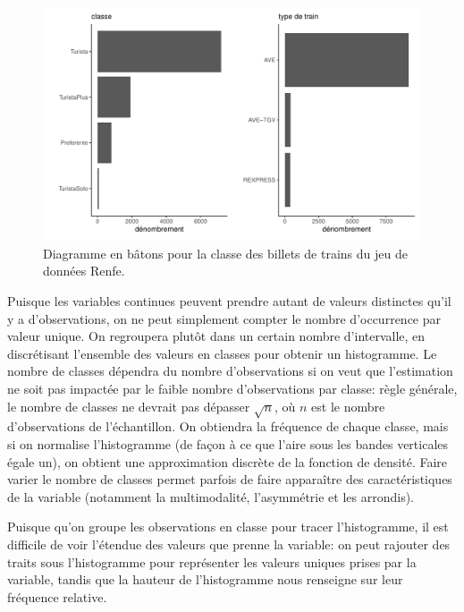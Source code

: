 \documentclass[
  11pt,
  letterpaper,
]{scrbook}
\theoremstyle{definition}
\theoremstyle{remark}
\begin{document}
\begin{figure}[ht!]

{\centering \includegraphics[width=1\textwidth,height=\textheight]{analyseexploratoire_files/figure-pdf/fig-barplotrenfe-1.pdf}

}

\caption{\label{fig-barplotrenfe}Diagramme en bâtons pour la classe des
billets de trains du jeu de données Renfe.}

\end{figure}

Puisque les variables continues peuvent prendre autant de valeurs
distinctes qu'il y a d'observations, on ne peut simplement compter le
nombre d'occurrence par valeur unique. On regroupera plutôt dans un
certain nombre d'intervalle, en discrétisant l'ensemble des valeurs en
classes pour obtenir un histogramme. Le nombre de classes dépendra du
nombre d'observations si on veut que l'estimation ne soit pas impactée
par le faible nombre d'observations par classe: règle générale, le
nombre de classes ne devrait pas dépasser \(\sqrt{n}\), où \(n\) est le
nombre d'observations de l'échantillon. On obtiendra la fréquence de
chaque classe, mais si on normalise l'histogramme (de façon à ce que
l'aire sous les bandes verticales égale un), on obtient une
approximation discrète de la fonction de densité. Faire varier le nombre
de classes permet parfois de faire apparaître des caractéristiques de la
variable (notamment la multimodalité, l'asymmétrie et les arrondis).

Puisque qu'on groupe les observations en classe pour tracer
l'histogramme, il est difficile de voir l'étendue des valeurs que prenne
la variable: on peut rajouter des traits sous l'histogramme pour
représenter les valeurs uniques prises par la variable, tandis que la
hauteur de l'histogramme nous renseigne sur leur fréquence relative.
\end{document}
